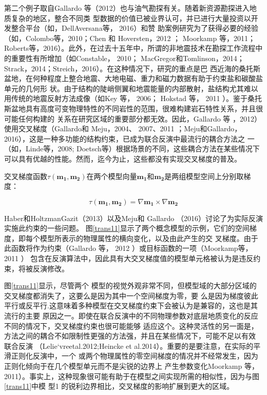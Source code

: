 第二个例子取自Gallardo 等（2012）也与油气勘探有关。随着新资源勘探进入地质复杂的地区，整合不同类 型数据的价值已被业界认可，并已进行大量投资以开发整合平台（如，DellAversana等， 2016）和赞 助案例研究为了获得必要的经验（如，Colombo等，2010；Chen 和 Hoversten，2012 ； Moorkamp 等，2011； Roberts等，2016）。此外，在过去十五年中，所谓的非地震技术在勘探工作流程中的重要性有所增加（如Constable， 2010； MacGregor和Tomlinson，2014； Strack，2014；Streich，2016）。在这种情况下，研究的重点是巴 西近海的桑托斯盆地，在何种程度上整合地震、大地电磁、重力和磁力数据有助于约束盐和碳酸盐单元的几何形 状。由于结构的陡峭侧翼和地震能量的内部散射，盐结构尤其难以用传统的地震反射方法成像（如Key 等， 2006； Hokstad 等， 2011 ）。鉴于桑托斯盆地具有高度可变物理特性的不同岩性的范围，很难构建岩石特性关系，并且很可能任何构建的 关系在研究区域的重要部分都无效。因此，Gallardo 等 ，2012）使用交叉梯度（Gallardo和 Meju，2004、 2007、2011 ；Meju和Gallardo，2016），这是一种多功能的结构约束，已成为联合反演中最流行的耦合方法之 一（如，Linde等，2008; Doetsch等）根据场景的不同，这些耦合方法在某些情况下可以具有优越的性能。然而，迄今为止，这些都没有实现交叉梯度的普及。

交叉梯度函数$\tau(\mathbf{m_1}, \mathbf{m_2})$在两个模型向量$\mathbf{m_1}$和$\mathbf{m_2}$是两组模型空间上分别取梯度：

\begin{equation}
    \tau(\mathbf{m_1}, \mathbf{m_2}) = \nabla \mathbf{m_1}\times \nabla \mathbf{m_2}
\end{equation}

Haber和HoltzmanGazit（2013）以及Meju和 Gallardo （2016）讨论了为实际反演实施此约束的一些问题。 图\ref{trans11}显示了两个概念模型的示例，它们的空间梯度，即每个模型所表示的物理属性的横向变化，以及由此产生的交 叉梯度。由于此函数将作为约束（Gallardo 等， 2012 ）或目标函数的一项（Moorkamp等， 2011 ） 包含在反演算法中，因此具有大交叉梯度值的模型单元格被认为是违反约束，将被反演修改。

图\ref{trans11}显示，尽管两个 模型的视觉外观非常不同，但模型域的大部分区域的交叉梯度都消失了，这要么是因为其中一个空间梯度为零，要 么是因为梯度彼此平行或反平行.这意味着多种模型在交叉梯度约束下会被认为是兼容的，这也是其流行的主要 原因之一。即使在联合反演中的不同物理参数对底层地质变化的反应不同的情况下，交叉梯度约束也很可能能够 适应这个。这种灵活性的另一面是，方法之间的耦合不如限制性更强的方法强，并且在某些情况下，可能不足以有效 联合反演 （Lelie`vreetal.2012;Heincke et al.2014）。重要的是要注意，在实际的平滑正则化反演中，一个 或两个物理属性的零空间梯度的情况并不经常发生，因为正则化倾向于在几个模型单元而不是尖锐的边界上 产生参数变化Moorkamp 等，2011）。事实上，这种现象很可能有助于在模型之间实现所需的相似性，因为与图\ref{trans11}中模 型1 的锐利边界相比，交叉梯度的影响扩展到更大的区域。


